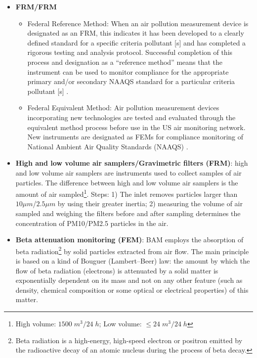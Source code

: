 \documentclass{article}
\begin{document}
\begin{itemize}
{\begin{itemize}
\begin{figure}[H]
                \label{fig:sensor}
            \end{figure}
            \item \textbf{FRM/FRM}
                \begin{itemize}
                    \item Federal Reference Method: When an air pollution measurement device is designated as an FRM, this indicates it has been developed to a clearly defined standard for a specific criteria pollutant [s] and has completed a rigorous testing and analysis protocol. Successful completion of this process and designation as a ``reference method'' means that the instrument can be used to monitor compliance for the appropriate primary and/or secondary NAAQS standard for a particular criteria pollutant [s] \citep{hall2014integrating}.
                    \item Federal Equivalent Method: Air pollution measurement devices incorporating new technologies are tested and evaluated through the equivalent method process before use in the US air monitoring network. New instruments are designated as FEMs for compliance monitoring of National Ambient Air Quality Standards (NAAQS) \citep{hall2014integrating}. 
                \end{itemize}
            \item \textbf{High and low volume air samplers/Gravimetric filters (FRM)}: high and low volume air samplers are instruments used to collect samples of air particles. The difference between high and low volume air samplers is the amount of air sampled\footnote{High volume: $1500\;m^3/24\;h$; Low volume: $\leq24\;m^3/24\;h$}. Steps: 1) The inlet removes particles larger than $10 \mu m$/$2.5 \mu m$ by using their greater inertia; 2) measuring the volume of air sampled and weighing the filters before and after sampling determines the concentration of PM10/PM2.5 particles in the air.
            \item \textbf{Beta attenuation monitoring (FEM)}: BAM employs the absorption of beta radiation\footnote{Beta radiation is a high-energy, high-speed electron or positron emitted by the radioactive decay of an atomic nucleus during the process of beta decay.} by solid particles extracted from air flow. The main principle is based on a kind of Bouguer (Lambert–Beer) law: the amount by which the flow of beta radiation (electrons) is attenuated by a solid matter is exponentially dependent on its mass and not on any other feature (such as density, chemical composition or some optical or electrical properties) of this matter.

\end{itemize}}
\end{itemize}
\end{document}
